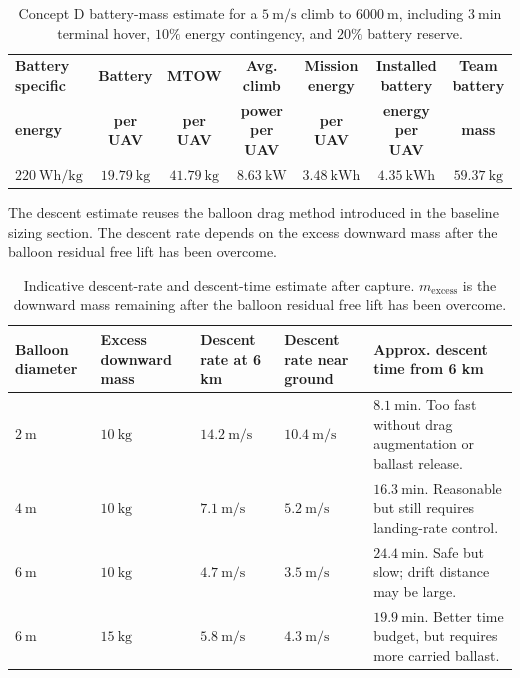 \begin{table}[H]
\centering
\small
\caption{Concept D battery-mass estimate for a \(5~\mathrm{m/s}\) climb to \(6000~\mathrm{m}\), including \(3~\mathrm{min}\) terminal hover, \(10\%\) energy contingency, and \(20\%\) battery reserve.}
\label{tab:conceptD_battery_mass_estimate}
\setlength{\tabcolsep}{5pt}
\renewcommand{\arraystretch}{1.15}
\begin{tabular}{lcccccc}
\toprule
\textbf{Battery specific} 
& \textbf{Battery} 
& \textbf{MTOW} 
& \textbf{Avg. climb} 
& \textbf{Mission energy} 
& \textbf{Installed battery} 
& \textbf{Team battery} \\
\textbf{energy} 
& \textbf{per UAV} 
& \textbf{per UAV} 
& \textbf{power per UAV} 
& \textbf{per UAV} 
& \textbf{energy per UAV} 
& \textbf{mass} \\
\midrule
\(220~\mathrm{Wh/kg}\) 
& \(19.79~\mathrm{kg}\) 
& \(41.79~\mathrm{kg}\) 
& \(8.63~\mathrm{kW}\) 
& \(3.48~\mathrm{kWh}\) 
& \(4.35~\mathrm{kWh}\) 
& \(59.37~\mathrm{kg}\) \\
\bottomrule
\end{tabular}
\end{table}




The descent estimate reuses the balloon drag method introduced in the baseline sizing section. The descent rate depends on the excess downward mass after the balloon residual free lift has been overcome.

\begin{table}[H]
\centering
\small
\caption{Indicative descent-rate and descent-time estimate after capture. \(m_{\mathrm{excess}}\) is the downward mass remaining after the balloon residual free lift has been overcome.}
\label{tab:conceptD_descent_time_estimate}
\begin{tabularx}{\textwidth}{p{} p{} p{} p{} X}
\toprule
\textbf{Balloon diameter}
& \textbf{Excess downward mass}
& \textbf{Descent rate at 6 km}
& \textbf{Descent rate near ground}
& \textbf{Approx. descent time from 6 km} \\
\midrule
\(2~\mathrm{m}\) & \(10~\mathrm{kg}\) & \(14.2~\mathrm{m/s}\) & \(10.4~\mathrm{m/s}\) & \(8.1~\mathrm{min}\). Too fast without drag augmentation or ballast release. \\
\(4~\mathrm{m}\) & \(10~\mathrm{kg}\) & \(7.1~\mathrm{m/s}\) & \(5.2~\mathrm{m/s}\) & \(16.3~\mathrm{min}\). Reasonable but still requires landing-rate control. \\
\(6~\mathrm{m}\) & \(10~\mathrm{kg}\) & \(4.7~\mathrm{m/s}\) & \(3.5~\mathrm{m/s}\) & \(24.4~\mathrm{min}\). Safe but slow; drift distance may be large. \\
\(6~\mathrm{m}\) & \(15~\mathrm{kg}\) & \(5.8~\mathrm{m/s}\) & \(4.3~\mathrm{m/s}\) & \(19.9~\mathrm{min}\). Better time budget, but requires more carried ballast. \\
\bottomrule
\end{tabularx}
\end{table}


